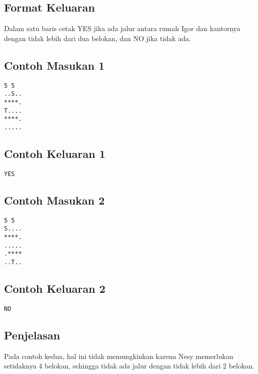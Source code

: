 \documentclass{article}
\begin{document}
\subsection*{Format Keluaran}

Dalam satu baris cetak YES jika ada jalur antara rumah Igor dan kantornya dengan tidak lebih dari dua belokan, dan NO jika tidak ada.

\begin{multicols}{2}
\subsection*{Contoh Masukan 1}
\begin{lstlisting}
5 5
..S..
****.
T....
****.
.....
\end{lstlisting}
\columnbreak
\subsection*{Contoh Keluaran 1}
\begin{lstlisting}
YES
\end{lstlisting}
\vfill
\null
\end{multicols}

\begin{multicols}{2}
\subsection*{Contoh Masukan 2}
\begin{lstlisting}
5 5
S....
****.
.....
.****
..T..
\end{lstlisting}
\columnbreak
\subsection*{Contoh Keluaran 2}
\begin{lstlisting}
NO
\end{lstlisting}
\vfill
\null
\end{multicols}


\subsection*{Penjelasan}

Pada contoh kedua, hal ini tidak memungkinkan karena Nesy memerlukan setidaknya 4 belokan, sehingga tidak ada jalur dengan tidak lebih dari 2 belokan.
\end{document}
